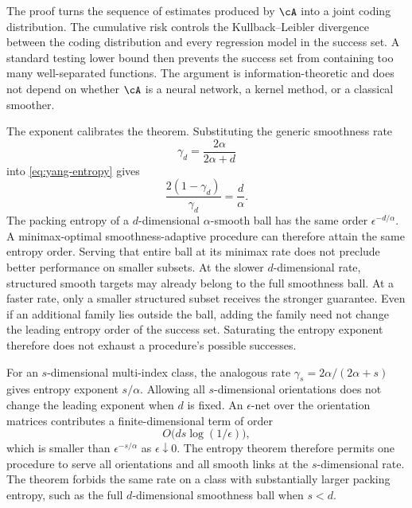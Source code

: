 \documentclass[11pt,twoside]{article}
\theoremstyle{definition}
\theoremstyle{remark}
\begin{document}
The proof turns the sequence of estimates produced by $\cA$ into a joint
coding distribution. The cumulative risk controls the Kullback--Leibler
divergence between the coding distribution and every regression model in the
success set. A standard
testing lower bound then prevents the success set from containing too many
well-separated functions. The argument is information-theoretic and does
not depend on whether $\cA$ is a neural network, a kernel method, or a
classical smoother.

The exponent calibrates the theorem. Substituting the generic smoothness
rate
\begin{equation}
 \gamma_d=\frac{2\alpha}{2\alpha+d}
 \label{eq:smoothness-gamma}
\end{equation}
into \cref{eq:yang-entropy} gives
\begin{equation}
 \frac{2(1-\gamma_d)}{\gamma_d}=\frac d\alpha.
 \label{eq:smoothness-entropy-exponent}
\end{equation}
The packing entropy of a $d$-dimensional $\alpha$-smooth ball has the same
order $\epsilon^{-d/\alpha}$. A minimax-optimal smoothness-adaptive
procedure can therefore attain the same entropy order. Serving that entire
ball at its minimax rate does not preclude better performance on smaller
subsets.
At the slower $d$-dimensional rate, structured smooth targets may already
belong to the full smoothness ball. At a faster rate, only a smaller
structured subset receives the stronger guarantee. Even if an additional
family lies outside the ball, adding the family need not change the leading
entropy order of the success set. Saturating the entropy exponent therefore
does not exhaust a procedure's possible successes.

For an $s$-dimensional multi-index class, the analogous rate
$\gamma_s=2\alpha/(2\alpha+s)$ gives entropy exponent $s/\alpha$. Allowing
all $s$-dimensional orientations does not change the leading exponent when
$d$ is fixed. An $\epsilon$-net over the orientation matrices contributes a
finite-dimensional term of order
\begin{equation}
 O\bigl(ds\log(1/\epsilon)\bigr),
 \label{eq:orientation-entropy}
\end{equation}
which is smaller than $\epsilon^{-s/\alpha}$ as $\epsilon\downarrow0$.
The entropy theorem therefore permits one procedure to serve all orientations
and all smooth links at the $s$-dimensional rate. The theorem forbids the
same rate on a class with substantially larger packing entropy, such as the
full $d$-dimensional smoothness ball when $s<d$.
\end{document}
